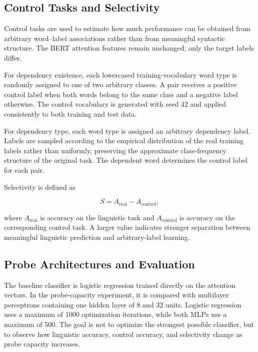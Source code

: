 \documentclass[12pt,a4paper]{article}
\begin{document}
\subsection{Control Tasks and Selectivity}

Control tasks are used to estimate how much performance can be obtained from arbitrary word--label associations rather than from meaningful syntactic structure. The BERT attention features remain unchanged; only the target labels differ.

For dependency existence, each lowercased training-vocabulary word type is randomly assigned to one of two arbitrary classes. A pair receives a positive control label when both words belong to the same class and a negative label otherwise. The control vocabulary is generated with seed 42 and applied consistently to both training and test data.

For dependency type, each word type is assigned an arbitrary dependency label. Labels are sampled according to the empirical distribution of the real training labels rather than uniformly, preserving the approximate class-frequency structure of the original task. The dependent word determines the control label for each pair.

Selectivity is defined as

\begin{equation}
S = A_{\mathrm{real}} - A_{\mathrm{control}},
\end{equation}

where \(A_{\mathrm{real}}\) is accuracy on the linguistic task and \(A_{\mathrm{control}}\) is accuracy on the corresponding control task. A larger value indicates stronger separation between meaningful linguistic prediction and arbitrary-label learning.

\subsection{Probe Architectures and Evaluation}

The baseline classifier is logistic regression trained directly on the attention vectors. In the probe-capacity experiment, it is compared with multilayer perceptrons containing one hidden layer of 8 and 32 units. Logistic regression uses a maximum of 1000 optimization iterations, while both MLPs use a maximum of 500. The goal is not to optimize the strongest possible classifier, but to observe how linguistic accuracy, control accuracy, and selectivity change as probe capacity increases.
\end{document}
